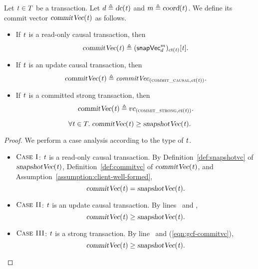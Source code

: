 \begin{appdefinition} \label{def:commitvc}
  Let $\mathit{t} \in T$ be a transaction.
  Let $d \triangleq \textsl{dc}(\mathit{t})$ and $m \triangleq \textsl{coord}(\mathit{t})$.
  We define its commit vector $\textsl{commitVec}(\mathit{t})$ as follows.
  \begin{itemize}
    \item If $\mathit{t}$ is a read-only causal transaction, then
      \[
        \textsl{commitVec}(\mathit{t}) \triangleq ({\sf snapVec}^{m}_{d})_{\textsl{ct}(\mathit{t})}[\mathit{t}].
      \]
    \item If $\mathit{t}$ is an update causal transaction, then
      \[
        \textsl{commitVec}(\mathit{t}) \triangleq \mathit{commitVec}_{(\textsc{commit\_causal}, \textsl{ct}(\mathit{t}))}.
      \]
    \item If $\mathit{t}$ is a committed strong transaction, then
      \[
        \textsl{commitVec}(\mathit{t}) \triangleq vc_{(\textsc{commit\_strong}, \textsl{ct}(\mathit{t}))}.
      \]
  \end{itemize}
\end{appdefinition}

\begin{applemma} \label{lemma:snapshotvc-commitvc}
  \[
    \forall \mathit{t} \in T.\; \textsl{commitVec}(\mathit{t}) \ge \textsl{snapshotVec}(\mathit{t}).
  \]
\end{applemma}

\begin{proof} \label{proof:snapshotvc-commitvc}
  We perform a case analysis according to the type of $\mathit{t}$.
  \begin{itemize}
    \item $\textsc{Case I}$: $\mathit{t}$ is a read-only causal transaction.
      By Definition~\ref{def:snapshotvc} of $\textsl{snapshotVec}(\mathit{t})$,
      Definition~\ref{def:commitvc} of $\textsl{commitVec}(\mathit{t})$,
      and Assumption~\ref{assumption:client-well-formed},
      \[
        \textsl{commitVec}(\mathit{t}) = \textsl{snapshotVec}(\mathit{t}).
      \]
    \item $\textsc{Case II}$: $\mathit{t}$ is an update causal transaction.
      By lines~\code{\ref{alg:unistore-coord}}{\ref{line:commitcausal-commitvc}}
      and \code{\ref{alg:unistore-coord}}{\ref{line:commitcausal-commitvc-d}},
      \[
        \textsl{commitVec}(\mathit{t}) \ge \textsl{snapshotVec}(\mathit{t}).
      \]
    \item $\textsc{Case III}$: $\mathit{t}$ is a strong transaction.
      By line~\code{\ref{alg:unistore-strong-commit}}{\ref{line:commitstrong-call-certify}}
      and (\ref{eqn:gcf-commitvc}),
      \[
        \textsl{commitVec}(\mathit{t}) \ge \textsl{snapshotVec}(\mathit{t}).
      \]
  \end{itemize}
\end{proof}

